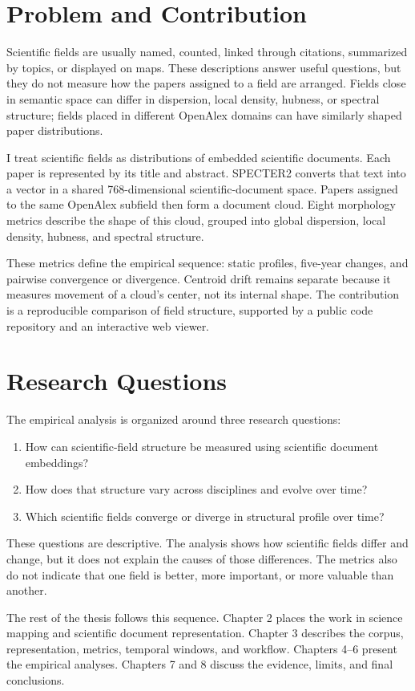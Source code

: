 
\section{Problem and Contribution}

Scientific fields are usually named, counted, linked through citations, summarized by topics, or displayed on maps. These descriptions answer useful questions, but they do not measure how the papers assigned to a field are arranged. Fields close in semantic space can differ in dispersion, local density, hubness, or spectral structure; fields placed in different OpenAlex domains can have similarly shaped paper distributions.

I treat scientific fields as distributions of embedded scientific documents. Each paper is represented by its title and abstract. SPECTER2 converts that text into a vector in a shared 768-dimensional scientific-document space. Papers assigned to the same OpenAlex subfield then form a document cloud. Eight morphology metrics describe the shape of this cloud, grouped into global dispersion, local density, hubness, and spectral structure.

These metrics define the empirical sequence: static profiles, five-year changes, and pairwise convergence or divergence. Centroid drift remains separate because it measures movement of a cloud's center, not its internal shape. The contribution is a reproducible comparison of field structure, supported by a public code repository and an interactive web viewer.

\section{Research Questions}

The empirical analysis is organized around three research questions:

\begin{enumerate}
\setlength{\itemsep}{0pt}
\setlength{\parskip}{0pt}
    \item How can scientific-field structure be measured using scientific document embeddings?
    \item How does that structure vary across disciplines and evolve over time?
    \item Which scientific fields converge or diverge in structural profile over time?
\end{enumerate}

These questions are descriptive. The analysis shows how scientific fields differ and change, but it does not explain the causes of those differences. The metrics also do not indicate that one field is better, more important, or more valuable than another.

The rest of the thesis follows this sequence. Chapter 2 places the work in science mapping and scientific document representation. Chapter 3 describes the corpus, representation, metrics, temporal windows, and workflow. Chapters 4--6 present the empirical analyses. Chapters 7 and 8 discuss the evidence, limits, and final conclusions.
